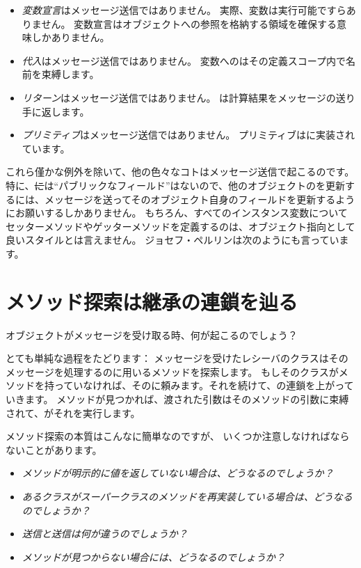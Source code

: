 \documentclass[a4paper,10pt,twoside]{book}
\begin{document}

\begin{itemize}
  \item \emph{変数宣言}はメッセージ送信ではありません。
		実際、変数は実行可能ですらありません。
		変数宣言はオブジェクトへの参照を格納する領域を確保する意味しかありません。
  \item \emph{代入}はメッセージ送信ではありません。
		変数へのはその定義スコープ内で名前を束縛します。
  \item \emph{リターン}はメッセージ送信ではありません。
		は計算結果をメッセージの送り手に返します。
  \item \emph{プリミティブ}はメッセージ送信ではありません。
		プリミティブはに実装されています。
\end{itemize}
これら僅かな例外を除いて、他の色々なコトはメッセージ送信で起こるのです。
特に、\st には``パブリックなフィールド''はないので、他のオブジェクトのを更新するには、メッセージを送ってそのオブジェクト自身のフィールドを更新するようにお願いするしかありません。
もちろん、すべてのインスタンス変数についてセッターメソッドやゲッターメソッドを定義するのは、オブジェクト指向として良いスタイルとは言えません。
ジョセフ・ペルリンは次のようにも言っています。

\section{メソッド探索は継承の連鎖を辿る}


オブジェクトがメッセージを受け取る時、何が起こるのでしょう？

とても単純な過程をたどります：
メッセージを受けたレシーバのクラスはそのメッセージを処理するのに用いるメソッドを探索します。
もしそのクラスがメソッドを持っていなければ、そのに頼みます。それを続けて、の連鎖を上がっていきます。
メソッドが見つかれば、渡された引数はそのメソッドの引数に束縛されて、がそれを実行します。

メソッド探索の本質はこんなに簡単なのですが、
いくつか注意しなければならないことがあります。

\begin{itemize}
  \item \emph{メソッドが明示的に値を返していない場合は、どうなるのでしょうか？}
  \item \emph{あるクラスがスーパークラスのメソッドを再実装している場合は、どうなるのでしょうか？}
  \item \emph{送信と送信は何が違うのでしょうか？}
  \item \emph{メソッドが見つからない場合には、どうなるのでしょうか？}
\end{itemize}
\end{document}

